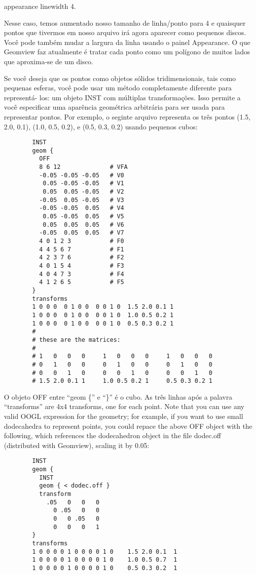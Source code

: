 \documentclass[12pt,a4paper]{article}
\begin{document}
        appearance {
            linewidth 4.
        }

        Nesse caso, temos aumentado nosso tamanho de linha/ponto para 4 e quaisquer pontos
        que tivermos em nosso arquivo ir\'a agora aparecer como pequenos discos. Voc\^e pode tamb\'em mudar
        a largura da linha usando o painel Appearance. O que Geomview faz atualmente
        \'e tratar cada ponto como um pol\'igono de muitos lados que aproxima-se de um disco.

        Se voc\^e deseja que os pontos como objetos s\'{o}lidos tridimensionais, tais como
        pequenas esferas, voc\^e pode usar um m\'etodo completamente diferente para represent\'a-
        los: um objeto INST com m\'ultiplas transforma\c{c}\~oes. Isso permite a voc\^e especificar uma
        apar\^encia geom\'etrica arbitr\'aria para ser usada para representar pontos. Por
        exemplo, o seginte arquivo representa os tr\^es pontos (1.5, 2.0, 0.1),
        (1.0, 0.5, 0.2), e (0.5, 0.3, 0.2) usando pequenos cubos:
        \begin{verbatim}
        INST
        geom {
          OFF
          8 6 12              # VFA
          -0.05 -0.05 -0.05   # V0
           0.05 -0.05 -0.05   # V1
           0.05  0.05 -0.05   # V2
          -0.05  0.05 -0.05   # V3
          -0.05 -0.05  0.05   # V4
           0.05 -0.05  0.05   # V5
           0.05  0.05  0.05   # V6
          -0.05  0.05  0.05   # V7
          4 0 1 2 3           # F0
          4 4 5 6 7           # F1
          4 2 3 7 6           # F2
          4 0 1 5 4           # F3
          4 0 4 7 3           # F4
          4 1 2 6 5           # F5
        }
        transforms
        1 0 0 0  0 1 0 0  0 0 1 0  1.5 2.0 0.1 1
        1 0 0 0  0 1 0 0  0 0 1 0  1.0 0.5 0.2 1
        1 0 0 0  0 1 0 0  0 0 1 0  0.5 0.3 0.2 1
        #
        # these are the matrices:
        #
        # 1   0   0   0     1   0   0   0     1   0   0   0
        # 0   1   0   0     0   1   0   0     0   1   0   0
        # 0   0   1   0     0   0   1   0     0   0   1   0
        # 1.5 2.0 0.1 1     1.0 0.5 0.2 1     0.5 0.3 0.2 1
        \end{verbatim}
        O objeto OFF entre ``geom \{'' e ``\}'' \'e o cubo. As tr\^es linhas
        ap\'{o}s a palavra ``transforms'' are 4x4 transforms, one for each point. Note
        that you can use any valid OOGL expression for the geometry; for
        example, if you want to use small dodecahedra to represent points, you
        could repace the above OFF object with the following, which references
        the dodecahedron object in the file dodec.off (distributed with
        Geomview), scaling it by 0.05:
        \begin{verbatim}
        INST
        geom {
          INST
          geom { < dodec.off }
          transform
            .05   0   0   0
              0 .05   0   0
              0   0 .05   0
              0   0   0   1
        }
        transforms
        1 0 0 0 0 1 0 0 0 0 1 0    1.5 2.0 0.1  1
        1 0 0 0 0 1 0 0 0 0 1 0    1.0 0.5 0.7  1
        1 0 0 0 0 1 0 0 0 0 1 0    0.5 0.3 0.2  1
        \end{verbatim}
\end{document}
